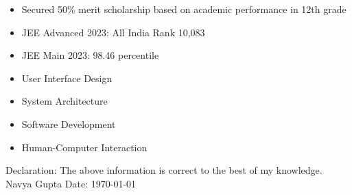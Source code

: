 \documentclass[10pt]{extarticle}
\newcommand{\yourname}{Navya Gupta}
\begin{document}
\begin{contained}
\begin{itemize}
    \setlength\itemsep{0.5pt}
    \item Secured 50\% merit scholarship based on academic performance in 12th grade
    \item JEE Advanced 2023: All India Rank 10,083
    \item JEE Main 2023: 98.46 percentile
\end{itemize}
\end{contained}

\begin{contained}
\begin{itemize}
    \setlength\itemsep{0.5pt}
    \item User Interface Design
    \item System Architecture
    \item Software Development
    \item Human-Computer Interaction
\end{itemize}
\end{contained}

Declaration: The above information is correct to the best of my knowledge.\newline
\yourname\newline
Date: \today
\end{document}
